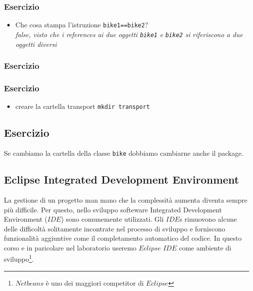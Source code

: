 \documentclass{article}
\theoremstyle{definition}
\begin{document}
\subsubsection{Esercizio}




\begin{itemize}
\item Che cosa stampa l'istruzione  \texttt{bike1==bike2}?\\
 \emph{false, visto che i references ai due oggetti  \texttt{bike1} e \texttt{bike2} si riferiscono a due oggetti diversi}
\end{itemize}


\subsubsection{Esercizio}



\subsubsection{Esercizio}

\begin{itemize}
\item creare la cartella transport \texttt{mkdir transport}
\end{itemize}


\subsection{Esercizio}



Se cambiamo la cartella della classe \texttt{bike} dobbiamo cambiarne anche il package.

\subsection{Eclipse Integrated Development Environment}
La gestione di un progetto man mano che la complessit\`a aumenta diventa sempre pi\`u difficile. Per questo, nello sviluppo softeware  Integrated Development Environment ($IDE$) sono comunemente utilizzati. Gli $IDE$s rimuovono alcune delle difficolt\`a solitamente incontrate nel processo di sviluppo e forniscono funzionalit\`a aggiuntive come il completamento automatico del codice. In questo corso e in paricolare nel laboratorio useremo $Eclipse$ $IDE$ come ambiente di sviluppo\footnote{$Netbeans$ \`e uno dei maggiori competitor di $Eclipse$}.  
\end{document}
